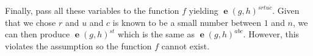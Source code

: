 \documentclass[pdftex,12pt,a4papaer,twoside,notitlepage]{report}
\DeclareMathOperator{\e}{\mathbf{e}}
\begin{document}
Finally, pass all these variables to the function $f$ yielding $\e(g, h)^{srtu
\dot c}$. Given that we chose $r$ and $u$ and $c$ is known to be a small number
between $1$ and $n$, we can then produce $\e(g, h)^{st}$ which is the same as
$\e(g, h)^{abc}$. However, this violates the assumption so the function $f$
cannot exist.


%
%
%
%
%
%
%
\end{document}
